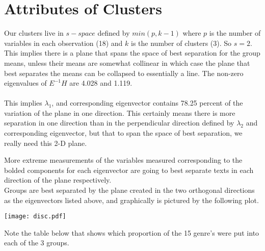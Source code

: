 \documentclass[11pt]{article}
\begin{document}
\section*{Attributes of Clusters}
Our clusters live in $s-space$ defined by $min(p,k-1)$ where $p$ is the number of variables in each observation (18) and $k$ is the number of clusters (3). So $s=2$. This implies there is a plane that spans the space of best separation for the group means, unless their means are somewhat collinear in which case the plane that best separates the means can be collapsed to essentially a line. The non-zero eigenvalues of $E^{-1}H$ are 4.028 and 1.119. 
\\
\\
This implies $\lambda_1$, and corresponding eigenvector contains 78.25 percent of the variation of the plane in one direction. This certainly means there is more separation in one direction than in the perpendicular direction defined by $\lambda_2$ and corresponding eigenvector, but that to span the space of best separation, we really need this 2-D plane.



\noindent  More extreme measurements of the variables measured corresponding to the bolded components for each eigenvector are going to best separate texts in each direction of the plane respectively. 
\\
\newpage
\noindent Groups are best separated by the plane created in the two orthogonal directions as the eigenvectors listed above, and graphically is pictured by the following plot.

\begin{center}
\texttt{[image: disc.pdf]}
\end{center}

\noindent Note the table below that shows which proportion of the 15 genre's were put into each of the 3 groups. 
\end{document}
